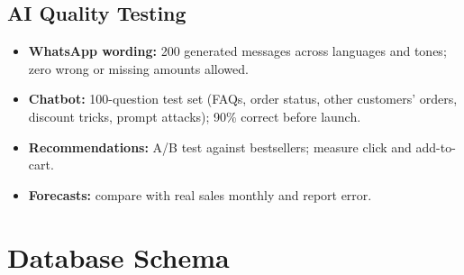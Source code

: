 \documentclass[11pt,a4paper]{article}
\begin{document}
\subsection{AI Quality Testing}
\begin{itemize}
\item \textbf{WhatsApp wording:} 200 generated messages across languages and tones; zero wrong or missing amounts allowed.
\item \textbf{Chatbot:} 100-question test set (FAQs, order status, other customers' orders, discount tricks, prompt attacks); 90\% correct before launch.
\item \textbf{Recommendations:} A/B test against bestsellers; measure click and add-to-cart.
\item \textbf{Forecasts:} compare with real sales monthly and report error.
\end{itemize}

\section{Database Schema}
\end{document}
